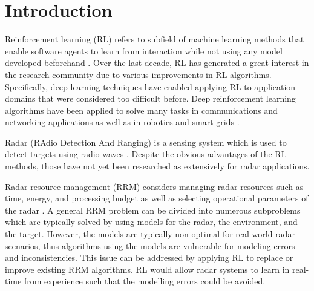 \documentclass[english, 12pt, a4paper, elec, utf8, a-1b, online]{aaltothesis}
\begin{document}
\cleardoublepage

\section{Introduction}


Reinforcement learning (RL) refers to subfield of machine learning methods that enable software agents to learn from interaction while not using any model developed beforehand \cite{Sutton2018}. 
Over the last decade, RL has generated a great interest in the research community due to various improvements in RL algorithms. 
Specifically, deep learning techniques have enabled applying RL to application domains that were considered too difficult before. 
Deep reinforcement learning algorithms have been applied to solve many tasks in communications and networking applications \cite{Luong2018} as well as in robotics \cite{Kober2013} and smart grids \cite{Zhang2018}. 


Radar (RAdio Detection And Ranging) is a sensing system which is used to detect targets using radio waves \cite{Curry2011}.
Despite the obvious advantages of the RL methods, those have not yet been researched as extensively for radar applications.

Radar resource management (RRM) considers managing radar resources such as time, energy, and processing budget as well as selecting operational parameters of the radar \cite{Moo2016}. 
A general RRM problem can be divided into numerous subproblems which are typically solved by using models for the radar, the environment, and the target.
However, the models are typically non-optimal for real-world radar scenarios, thus algorithms using the models are vulnerable for modeling errors and inconsistencies.  
This issue can be addressed by applying RL to replace or improve existing RRM algorithms. 
RL would allow radar systems to learn in real-time from experience such that the modelling errors could be avoided. 
\end{document}
